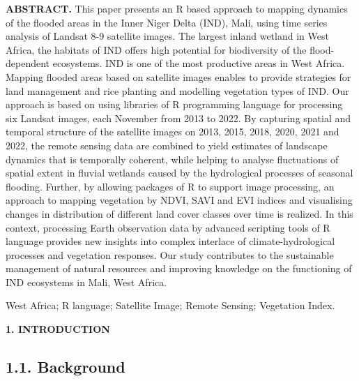 \documentclass[12pt,a4paper,oneside]{article}
\def \newsection{\vspace{12pt}\textbf}
\def \newpar{\vspace{6pt}}
\begin{document}
{\bf ABSTRACT.} This paper presents an R based approach to mapping dynamics of the flooded areas in the Inner Niger Delta (IND), Mali, using time series analysis of Landsat 8-9 satellite images. The largest inland wetland in West Africa, the habitats of IND offers high potential for biodiversity of the flood-dependent ecosystems. IND is one of the most productive areas in West Africa. Mapping flooded areas based on satellite images enables to provide strategies for land management and rice planting and modelling vegetation types of IND. Our approach is based on using libraries of R programming language for processing six Landsat images, each November from 2013 to 2022. By capturing spatial and temporal structure of the satellite images on 2013, 2015, 2018, 2020, 2021 and 2022, the remote sensing data are combined to yield estimates of landscape dynamics that is temporally coherent, while helping to analyse fluctuations of spatial extent in fluvial wetlands caused by the hydrological processes of seasonal flooding. Further, by allowing packages of R to support image processing, an approach to mapping vegetation by NDVI, SAVI and EVI indices and visualising changes in distribution of different land cover classes over time is realized. In this context, processing Earth observation data by advanced scripting tools of R language provides new insights into complex interlace of climate-hydrological processes and vegetation responses. Our study contributes to the sustainable management of natural resources and improving knowledge on the functioning of IND ecosystems in Mali, West Africa. 

\newpar {\bf Keywords:} West Africa; R language; Satellite Image; Remote Sensing; Vegetation Index.


\newsection {1. INTRODUCTION}

\subsection*{1.1. Background}
\end{document}

